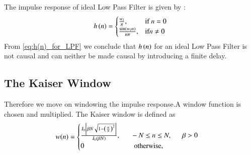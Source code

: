 \documentclass{article}
\begin{document}
The impulse response of ideal Low Pass Filter is given by :
\begin{align}
    h\left(n\right) =
\begin{cases}
    \frac{w_l}{\pi}, & \text{if } n = 0 \\
    \frac{\sin(w_l n)}{n\pi}, & \text{if} n \neq 0
\end{cases} \label{eq:h(n)_for_LPF}
\end{align}
From \eqref{eq:h(n)_for_LPF} we conclude that $h\left(n\right)$ for an ideal Low Pass Filter is not causal and can neither be made causal by introducing a finite delay.
\subsection{The Kaiser Window}
Therefore we move on windowing the impulse response.A window function is chosen and multiplied. The Kaiser window is defined as
\begin{align}
    w(n) =
    \begin{cases}
    \frac{I_0\left[ \beta N \sqrt{1 - \left(\frac{n}{N}\right)^2} \right]}{I_0(\beta N)},
\indent -N \leq n \leq N, \indent \beta > 0 \nonumber \\
 0 \hspace{2.5 cm} \mbox{otherwise,}
 \end{cases}
\end{align}
\end{document}
